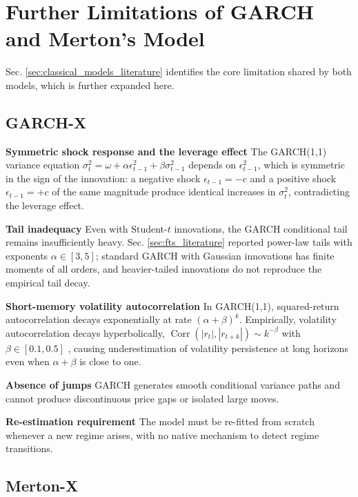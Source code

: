 \section{Further Limitations of GARCH and Merton's Model}
\label{app:sec:limitations}

Sec. \ref{sec:classical_models_literature} identifies the core limitation shared by both models, which is further expanded here.

\subsection{GARCH-X}
\label{app:sec:garch_limitations}

\textbf{Symmetric shock response and the leverage effect} \quad The GARCH(1,1) variance equation $\sigma_t^2 = \omega + \alpha\epsilon_{t-1}^2 + \beta\sigma_{t-1}^2$ depends on $\epsilon_{t-1}^2$, which is symmetric in the sign of the innovation: a negative shock $\epsilon_{t-1} = -c$ and a positive shock $\epsilon_{t-1} = +c$ of the same magnitude produce identical increases in $\sigma_t^2$, contradicting the leverage effect.

\textbf{Tail inadequacy} \quad Even with Student-$t$ innovations, the GARCH conditional tail remains insufficiently heavy. Sec. \ref{sec:fts_literature} reported power-law tails with exponents $\alpha \in [3,5]$; standard GARCH with Gaussian innovations has finite moments of all orders, and heavier-tailed innovations do not reproduce the empirical tail decay.

\textbf{Short-memory volatility autocorrelation} \quad In GARCH(1,1), squared-return autocorrelation decays exponentially at rate $(\alpha + \beta)^k$. Empirically, volatility autocorrelation decays hyperbolically, $\operatorname{Corr}(|r_t|, |r_{t+k}|) \sim k^{-\beta}$ with $\beta \in [0.1, 0.5]$ \cite{cont2001empirical}, causing underestimation of volatility persistence at long horizons even when $\alpha + \beta$ is close to one.

\textbf{Absence of jumps} \quad GARCH generates smooth conditional variance paths and cannot produce discontinuous price gaps or isolated large moves.

\textbf{Re-estimation requirement} \quad The model must be re-fitted from scratch whenever a new regime arises, with no native mechanism to detect regime transitions.

\subsection{Merton-X}
\label{app:sec:merton_limitation}

